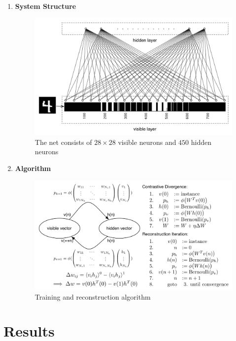 \documentclass[12pt]{article}
\begin{document}
\begin{enumerate}
	\item {\bf System Structure}
	\begin{figure}[ht]
		\hspace{-1em}
		\includegraphics[scale=.45]{../res/netStruct.png}
		\caption{The net consists of $28 \times 28$ visible neurons and $450$ hidden neurons}
	\end{figure}
	
	\newpage
	\item {\bf Algorithm}
	\begin{figure}[ht]
		\includegraphics[scale=.4]{../res/algo.png}
		\caption{Training and reconstruction algorithm}
	\end{figure}
\end{enumerate}

\section*{Results}
\vspace{-20pt}
\noindent\makebox[\linewidth]{\rule{\textwidth}{0.4pt}}
\end{document}
